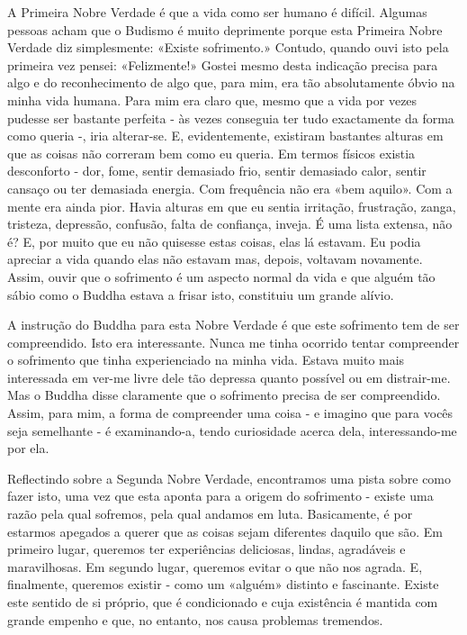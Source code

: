 A Primeira Nobre Verdade é que a vida como ser humano é difícil. Algumas
pessoas acham que o Budismo é muito deprimente porque esta Primeira
Nobre Verdade diz simplesmente: «Existe sofrimento.» Contudo, quando
ouvi isto pela primeira vez pensei: «Felizmente!» Gostei mesmo desta
indicação precisa para algo e do reconhecimento de algo que, para mim,
era tão absolutamente óbvio na minha vida humana. Para mim era claro
que, mesmo que a vida por vezes pudesse ser bastante perfeita - às vezes
conseguia ter tudo exactamente da forma como queria -, iria alterar-se.
E, evidentemente, existiram bastantes alturas em que as coisas não
correram bem como eu queria. Em termos físicos existia desconforto -
dor, fome, sentir demasiado frio, sentir demasiado calor, sentir cansaço
ou ter demasiada energia. Com frequência não era «bem aquilo». Com a
mente era ainda pior. Havia alturas em que eu sentia irritação,
frustração, zanga, tristeza, depressão, confusão, falta de confiança,
inveja. É uma lista extensa, não é? E, por muito que eu não quisesse
estas coisas, elas lá estavam. Eu podia apreciar a vida quando elas não
estavam mas, depois, voltavam novamente. Assim, ouvir que o sofrimento é
um aspecto normal da vida e que alguém tão sábio como o Buddha estava a
frisar isto, constituiu um grande alívio.


A instrução do Buddha para esta Nobre Verdade é que este sofrimento tem
de ser compreendido. Isto era interessante. Nunca me tinha ocorrido
tentar compreender o sofrimento que tinha experienciado na minha vida.
Estava muito mais interessada em ver-me livre dele tão depressa quanto
possível ou em distrair-me. Mas o Buddha disse claramente que o
sofrimento precisa de ser compreendido. Assim, para mim, a forma de
compreender uma coisa - e imagino que para vocês seja semelhante - é
\mbox{examinando-a}, tendo curiosidade acerca dela, interessando-me por ela.

Reflectindo sobre a Segunda Nobre Verdade, encontramos uma pista sobre
como fazer isto, uma vez que esta aponta para a origem do sofrimento -
existe uma razão pela qual sofremos, pela qual andamos em luta.
Basicamente, é por estarmos apegados a querer que as coisas sejam
diferentes daquilo que são. Em primeiro lugar, queremos ter experiências
deliciosas, lindas, agradáveis e maravilhosas. Em segundo lugar,
queremos evitar o que não nos agrada. E, finalmente, queremos existir -
como um «alguém» distinto e fascinante. Existe este sentido de si
próprio, que é condicionado e cuja existência é mantida com grande
empenho e que, no entanto, nos causa problemas tremendos.

